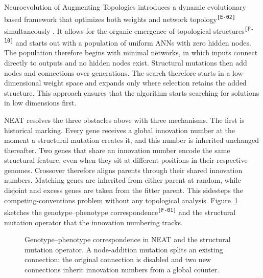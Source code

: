 \documentclass[12pt]{article}
\newcommand{\revID}[1]{\textsuperscript{\scriptsize\texttt{[#1]}}}
\newcommand{\revPlain}[2]{\textcolor{lrGreen}{#2}\revID{#1}}    %
\newcommand{\revBrit}[2]{\textcolor{lrBlue}{#2}\revID{#1}}      %
\newcommand{\revFig}[2]{\textcolor{lrAmber}{#2}\revID{#1}}      %
\begin{document}

Neuroevolution of Augmenting Topologies introduces a dynamic evolutionary based framework that \revBrit{E-02}{optimizes both weights and network topology} simultaneously \parencite{stanley_evolving_2002}.
\revPlain{P-10}{It allows for the organic emergence of topological structures} and starts out with a population of uniform ANNs with zero hidden nodes.
The population therefore begins with minimal networks, in which inputs connect directly to outputs and no hidden nodes exist.
Structural mutations then add nodes and connections over generations. The search therefore starts in a low-dimensional weight space and expands only where selection retains the added structure.
This approach ensures that the algorithm starts searching for solutions in low dimensions first.

NEAT resolves the three obstacles above with three mechanisms.
The first is historical marking.
Every gene receives a global innovation number at the moment a structural mutation creates it, and this number is inherited unchanged thereafter.
Two genes that share an innovation number encode the same structural feature, even when they sit at different positions in their respective genomes.
Crossover therefore aligns parents through their shared innovation numbers.
Matching genes are inherited from either parent at random, while disjoint and excess genes are taken from the fitter parent.
This sidesteps the competing-conventions problem without any topological analysis.
\revFig{F-01}{Figure~\ref{fig:genotype-phenotype} sketches the genotype--phenotype correspondence} and the structural mutation operator that the innovation numbering tracks.

\begin{figure}[h]
\centering
{}
\caption{Genotype--phenotype correspondence in NEAT and the structural mutation operator. A node-addition mutation splits an existing connection: the original connection is disabled and two new connections inherit innovation numbers from a global counter.}
\label{fig:genotype-phenotype}
\end{figure}
\end{document}
